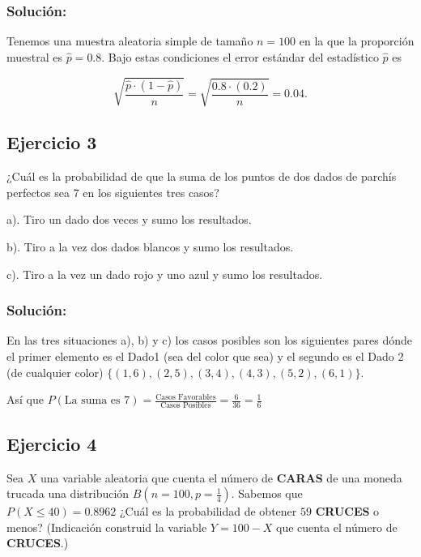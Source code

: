\documentclass[]{article}
\begin{document}
\hypertarget{soluciuxf3n-1}{%
\subsubsection{Solución:}\label{soluciuxf3n-1}}

Tenemos una muestra aleatoria simple de tamaño \(n=100\) en la que la
proporción muestral es \(\hat{p}=0.8\). Bajo estas condiciones el error
estándar del estadístico \(\hat{p}\) es

\[\sqrt{\frac{\hat{p}\cdot (1- \hat{p})}{n}}=\sqrt{\frac{0.8\cdot (0.2)}{ n}}=0.04.\]

\hypertarget{ejercicio-3}{%
\subsection{Ejercicio 3}\label{ejercicio-3}}

¿Cuál es la probabilidad de que la suma de los puntos de dos dados de
parchís perfectos sea \(7\) en los siguientes tres casos?

a). Tiro un dado dos veces y sumo los resultados.

b). Tiro a la vez dos dados blancos y sumo los resultados.

c). Tiro a la vez un dado rojo y uno azul y sumo los resultados.

\hypertarget{soluciuxf3n-2}{%
\subsubsection{Solución:}\label{soluciuxf3n-2}}

En las tres situaciones a), b) y c) los casos posibles son los
siguientes pares dónde el primer elemento es el Dado1 (sea del color que
sea) y el segundo es el Dado 2 (de cualquier color)
\(\{(1,6),(2,5),(3,4),(4,3),(5,2),(6,1)\}\).

Así que
\(P( \mbox{La suma es } 7)=\frac{\mbox{Casos Favorables}}{\mbox{Casos Posibles}}=\frac{6}{36}=\frac{1}{6}\)

\hypertarget{ejercicio-4}{%
\subsection{Ejercicio 4}\label{ejercicio-4}}

Sea \(X\) una variable aleatoria que cuenta el número de \textbf{CARAS}
de una moneda trucada una distribución \(B(n=100,p=\frac{1}{4})\).
Sabemos que \(P(X\leq 40)=0.8962\) ¿Cuál es la probabilidad de obtener
\(59\) \textbf{CRUCES} o menos? (Indicación construid la variable
\(Y=100-X\) que cuenta el número de \textbf{CRUCES}.)
\end{document}

